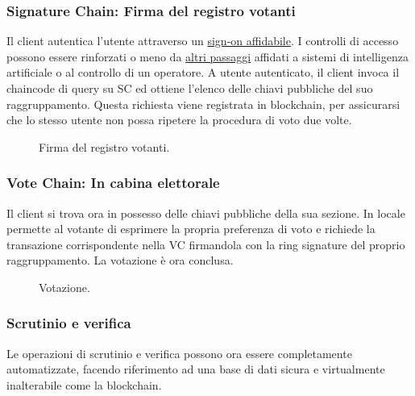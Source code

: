 		\subsubsection{Signature Chain: Firma del registro votanti}
			Il client autentica l'utente attraverso un \hyperref[subsec:personalita_voto]{sign-on affidabile}. I controlli di accesso possono essere rinforzati o meno da \hyperref[subsec:liberta_voto]{altri passaggi} affidati a sistemi di intelligenza artificiale o al controllo di un operatore. A utente autenticato, il client invoca il chaincode di query su SC ed ottiene l'elenco delle chiavi pubbliche del suo raggruppamento. Questa richiesta viene registrata in blockchain, per assicurarsi che lo stesso utente non possa ripetere la procedura di voto due volte.
			\begin{figure}[ht]
				\centering
				\hspace{5mm}
				\caption[Firma del registro votanti]{Firma del registro votanti.}
				\label{fig:firma_voto}
			\end{figure}
			
		\subsubsection{Vote Chain: In cabina elettorale}
			Il client si trova ora in possesso delle chiavi pubbliche della sua sezione. In locale permette al votante di esprimere la propria preferenza di voto e richiede la transazione corrispondente nella VC firmandola con la ring signature del proprio raggruppamento.
			La votazione è ora conclusa.
			\begin{figure}[ht]
				\centering
				\hspace{5mm}
				\caption[Votazione]{Votazione.}
				\label{fig:votazione}
			\end{figure}
			
		\subsubsection{Scrutinio e verifica}
			Le operazioni di scrutinio e verifica possono ora essere completamente automatizzate, facendo riferimento ad una base di dati sicura e virtualmente inalterabile come la blockchain.

